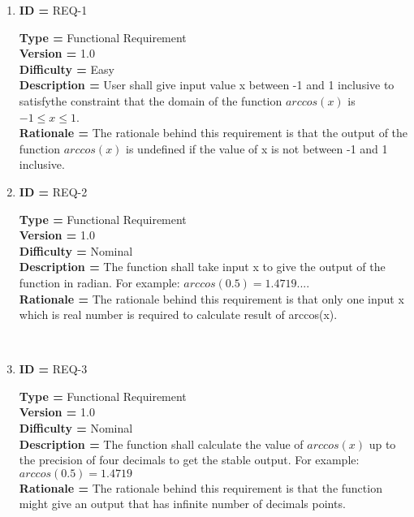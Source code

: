 \documentclass{article}
\begin{document}
\begin{enumerate}[label=(\alph*)]
\item \textbf{ID = } REQ-1
\\
\begin{Large}
 \large \textbf{Type = } Functional Requirement
 \\
 \large \textbf{Version = } 1.0
 \\
 \large \textbf{Difficulty =} Easy
 \\
 \large \textbf{ Description  = }User shall give input value x between -1 and 1 inclusive to satisfythe constraint that the domain of the function $arccos(x)$ is $-1\le x\le1$.
 \\
  \large \textbf{Rationale =} The rationale behind this requirement is that the output of the function $arccos(x)$ is undefined if the value of x is not between -1 and 1 inclusive.
 \\
 
\end{Large}

\item \textbf{ID = } REQ-2
\\
\begin{Large}
 \large \textbf{Type = } Functional Requirement
 \\
 \large \textbf{Version = } 1.0
 \\
  \large \textbf{Difficulty =} Nominal
  \\
 \large \textbf{ Description  = } The function shall take input x to give the output of the function in radian. For example: $arccos(0.5)=1.4719...$.
 \\
  \large \textbf{Rationale =} The rationale behind this requirement is that only one input x which is real number is required to calculate result of arccos(x).
 \\

\end{Large}
\\

\item \textbf{ID = } REQ-3
\\
\begin{Large}
 \large \textbf{Type = } Functional Requirement
 \\
 \large \textbf{Version = } 1.0
 \\
  \large \textbf{Difficulty =} Nominal
  \\
 \large \textbf{ Description  = } The function shall calculate the value of $arccos(x)$ up to the precision of four decimals to get the stable output. For example: $arccos(0.5)=1.4719$
 \\
  \large \textbf{Rationale =} The rationale behind this requirement is that the function might give an output that has infinite number of decimals points. 
 \\

\end{Large}
\end{enumerate}
\end{document}
